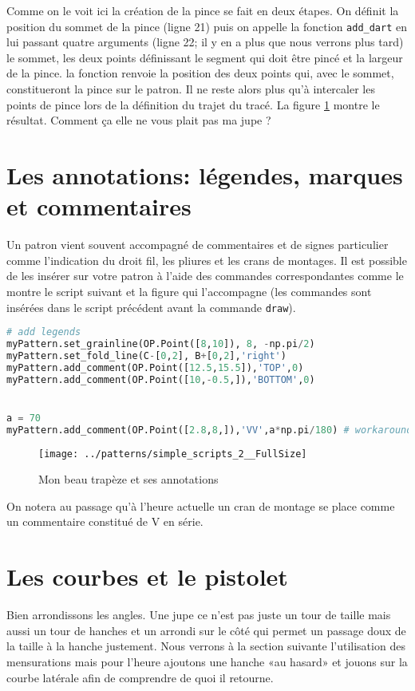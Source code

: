 \documentclass[10pt,a4paper,twoside]{report}
\begin{document}
Comme on le voit ici la création de la pince se fait en deux étapes. On définit la position du sommet de la pince (ligne 21) puis on appelle la fonction \texttt{add\_dart} en lui passant quatre arguments (ligne 22; il y en a plus que nous verrons plus tard) le sommet, les deux points définissant le segment qui doit être pincé et la largeur de la pince. la fonction renvoie la position des deux points qui, avec le sommet, constitueront la pince sur le patron.  Il ne reste alors plus qu'à intercaler les points de pince lors de la définition du trajet du tracé. La figure \ref{fig:trapeze} montre le résultat. Comment ça elle ne vous plait pas ma jupe ?

\section{Les annotations: légendes, marques et commentaires}

Un patron vient souvent accompagné de commentaires et de signes particulier comme l'indication du droit fil, les pliures et les crans de montages. Il est possible de les insérer sur votre patron à l'aide des commandes correspondantes comme le montre le script suivant et la figure qui l'accompagne (les commandes sont insérées dans le script précédent avant la commande \texttt{draw}).

\begin{lstlisting}[language=Python]
# add legends
myPattern.set_grainline(OP.Point([8,10]), 8, -np.pi/2)
myPattern.set_fold_line(C-[0,2], B+[0,2],'right')
myPattern.add_comment(OP.Point([12.5,15.5]),'TOP',0)
myPattern.add_comment(OP.Point([10,-0.5,]),'BOTTOM',0)


a = 70
myPattern.add_comment(OP.Point([2.8,8,]),'VV',a*np.pi/180) # workaround for notches
\end{lstlisting}


\begin{figure}
\begin{center}
\texttt{[image: ../patterns/simple\_scripts\_2\_\_FullSize]}
\end{center}
\caption{Mon beau trapèze et ses annotations}
\label{fig:trapeze}
\end{figure}

On notera au passage qu'à l'heure actuelle un cran de montage se place comme un commentaire constitué de V en série.

\section{Les courbes et le pistolet}
Bien arrondissons les angles. Une jupe ce n'est pas juste un tour de taille mais aussi un tour de hanches et un arrondi sur le côté qui permet un passage doux de la taille à la hanche justement. Nous verrons à la section suivante l'utilisation des mensurations mais pour l'heure ajoutons une hanche «au hasard» et jouons sur la courbe latérale afin de comprendre de quoi il retourne.
\end{document}
